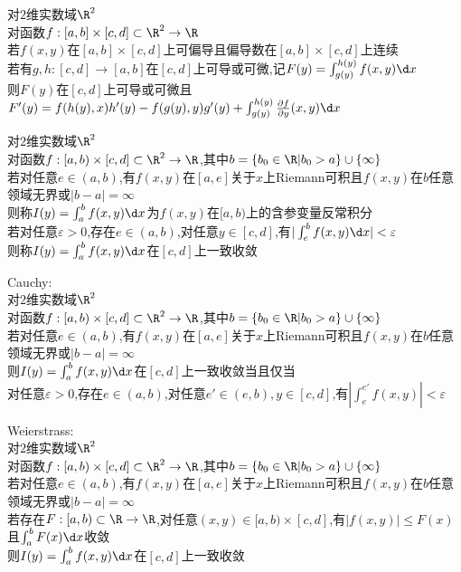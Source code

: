 \begin{dingli}
对$2$维实数域$\R^2$\\
对函数$f:[a,b]\times[c,d]\subset \R^2 \to \R$\\
若$f(x,y)$在$[a,b]\times[c,d]$上可偏导且偏导数在$[a,b]\times[c,d]$上连续\\
若有$g,h:[c,d]\to [a,b]$在$[c,d]$上可导或可微,记$F(y)=\int_{g(y)}^{h(y)}f(x,y)\d x$\\
则$F(y)$在$[c,d]$上可导或可微且$F'(y)=f(h(y),x)h'(y)-f(g(y),y)g'(y)+\int_{g(y)}^{h(y)}\frac{\partial f}{\partial y}(x,y)\d x$
\end{dingli}

\begin{dingyi}
对$2$维实数域$\R^2$\\
对函数$f:[a,b)\times[c,d]\subset \R^2 \to \R$,其中$b=\{b_0\in\R|b_0>a\}\cup\{\infty\}$\\
 若对任意$e\in(a,b)$,有$f(x,y)$在$[a,e]$关于$x$上Riemann可积且$f(x,y)$在$b$任意领域无界或$|b-a|=\infty$\\
则称$I(y)=\int_{a}^{b}f(x,y)\d x$为$f(x,y)$在$[a,b)$上的含参变量反常积分\\
若对任意$\varepsilon>0$,存在$e\in (a,b)$,对任意$y\in [c,d]$,有$|\int_{e}^{b}f(x,y)\d x|<\varepsilon$\\
则称$I(y)=\int_{a}^{b}f(x,y)\d x$在$[c,d]$上一致收敛
\end{dingyi}

\begin{dingli}
Cauchy:\\
对$2$维实数域$\R^2$\\
对函数$f:[a,b)\times[c,d]\subset \R^2 \to \R$,其中$b=\{b_0\in\R|b_0>a\}\cup\{\infty\}$\\
 若对任意$e\in(a,b)$,有$f(x,y)$在$[a,e]$关于$x$上Riemann可积且$f(x,y)$在$b$任意领域无界或$|b-a|=\infty$\\
则$I(y)=\int_{a}^{b}f(x,y)\d x$在$[c,d]$上一致收敛当且仅当\\
对任意$\varepsilon>0$,存在$e\in (a,b)$,对任意$e'\in(e,b),y\in [c,d]$,有$|\int_{e}^{e'}f(x,y)|<\varepsilon$
\end{dingli}

\begin{dingli}
Weierstrass:\\
对$2$维实数域$\R^2$\\
对函数$f:[a,b)\times[c,d]\subset \R^2 \to \R$,其中$b=\{b_0\in\R|b_0>a\}\cup\{\infty\}$\\
若对任意$e\in(a,b)$,有$f(x,y)$在$[a,e]$关于$x$上Riemann可积且$f(x,y)$在$b$任意领域无界或$|b-a|=\infty$\\
若存在$F:[a,b)\subset \R\to\R$,对任意$(x,y)\in[a,b)\times[c,d]$,有$|f(x,y)|\leq F(x)$且$\int_{a}^{b}F(x)\d x$收敛\\
则$I(y)=\int_{a}^{b}f(x,y)\d x$在$[c,d]$上一致收敛
\end{dingli}

